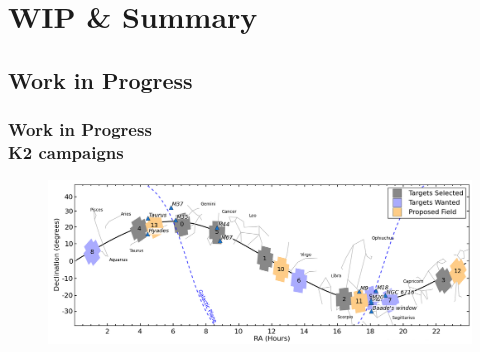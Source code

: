 \documentclass[hyperref={pdfpagelabels=false}]{beamer}
\begin{document}

\section{WIP \& Summary}

\subsection{Work in Progress}

\begin{frame}
\frametitle{Work in Progress\\K2 campaigns}
        \begin{figure}
          \includegraphics[scale=0.325]{images/K2Campaigns.jpg}
        \end{figure}
\end{frame}
\end{document}
